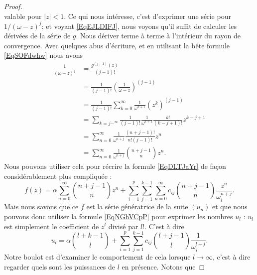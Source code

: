 \begin{proof}
\begin{equation}
    \end{equation}
    valable pour \( | z |<1\). Ce qui nous intéresse, c'est d'exprimer une série pour \( 1/(\omega-z)^j\); et voyant \eqref{EqEJLDIFJ}, nous voyons qu'il suffit de calculer les dérivées de la série de \( g\). Nous dériver terme à terme à l'intérieur du rayon de convergence. Avec quelques abus d'écriture, et en utilisant la bête formule \eqref{EqSOFdwhw} nous avons
    \begin{subequations}
        \begin{align}
            \frac{1}{ (\omega-z)^j }&=\frac{ g^{(j-1)}(z) }{ (j-1)! }\\
            &=\frac{1}{ (j-1)! }\left( \frac{1}{ \omega-z } \right)^{(j-1)}\\
            &=\frac{1}{ (j-1)! }\sum_{k=0}^{\infty}\frac{1}{ \omega^{k+1} }(z^k)^{(j-1)}\\
            &=\sum_{k=j-^{\infty}}\frac{1}{ (j-1)! }\frac{1}{ \omega^{k+1} }\frac{ k! }{ (k-j+1)! }z^{k-j+1}\\
            &=\sum_{n=0}^{\infty}\frac{1}{ \omega^{n+j} }\frac{ (n+j-1)! }{ n!(j-1)! }z^n\\
            &=\sum_{n=0}^{\infty}\frac{1}{ \omega^{n+j} }{n+j-1\choose n}z^n.
        \end{align}
    \end{subequations}
    Nous pouvons utiliser cela pour récrire la formule \eqref{EqDLTJaYr} de façon considérablement plus compliquée :
    \begin{equation}
            f(z)=\alpha\sum_{n=0}^{\infty}{n+j-1\choose n}z^n
            +\sum_{i=1}^p\sum_{j=1}^{k-1}\sum_{n=0}^{\infty}c_{ij}{n+j-1\choose n}\frac{ z^n }{ \omega_i^{n+j} }.
    \end{equation}
    Mais nous savons que ce \( f\) est la série génératrice de la suite \( (u_n)\) et que nous pouvons donc utiliser la formule \eqref{EqNGhVCpP} pour exprimer les nombres \( u_l\) : \( u_l\) est simplement le coefficient de \( z^l\) divisé par \( l!\). C'est à dire
    \begin{equation}
        u_l=\alpha{l+k-1\choose l}+\sum_{i=1}^p\sum_{j=1}^{k-1}c_{ij}{l+j-1\choose l}\frac{1}{ \omega_i^{l+j} }.
    \end{equation}
    Notre boulot est d'examiner le comportement de cela lorsque \( l\to\infty\), c'est à dire regarder quels sont les puissances de \( l\) en présence. Notons que


\end{proof}

